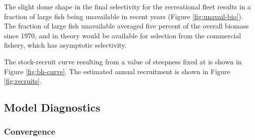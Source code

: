 \documentclass[11pt,
  english,
  a4paper,
]{article}
\begin{document}
\leavevmode\tagmcend\tagstructend\par


The slight dome shape in the final selectivity for the recreational fleet results in a fraction of large fish being unavailable in recent years (Figure \ref{fig:unavail-bio}). The fraction of large fish unavailable averaged five percent of the overall biomass since 1970, and in theory would be available for selection from the commercial fishery, which has asymptotic selectivity.

\leavevmode\tagmcend\tagstructend\par


The stock-recruit curve resulting from a value of steepness fixed at is shown in Figure \ref{fig:bh-curve}. The estimated annual recruitment is shown in Figure \ref{fig:recruits}.

\leavevmode\tagmcend\tagstructend\par


\hypertarget{model-diagnostics}{%
\subsection{Model Diagnostics}\label{model-diagnostics}}

\leavevmode\tagmcend\tagstructend


\hypertarget{convergence}{%
\subsubsection{Convergence}\label{convergence}}

\leavevmode\tagmcend\tagstructend

\end{document}
